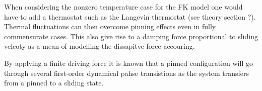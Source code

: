 When considering the nonzero temperature case for the FK model one would have to add a thermostat such as the Langevin thermostat (see theory section ?). Thermal fluctuations can then overcome pinning effects even in fully commensurate cases. This also give rise to a damping force proportional to sliding velcoty as a mean of modelling the dissapitve force accouring.

By applying a finite driving force it is known that a pinned configuration will go through several first-order dynamical pahse transistions as the system transfers from a pinned to a sliding state. 















